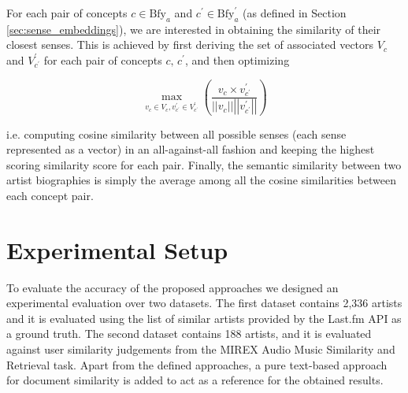 For each pair of concepts $c \in \text{Bfy}_{a}$ and $c^{\prime} \in \text{Bfy}^{\prime}_{a}$ (as defined in Section \ref{sec:sense_embeddings}), we are interested in obtaining the similarity of their closest senses. This is achieved by first deriving the set of associated vectors $V_c$ and $V_{c^{\prime}}^{\prime}$ for each pair of concepts $c,\,c^{\prime}$, and then optimizing

\begin{equation}
\operatorname{max}_{v_c \in V_c , v_{c^{\prime}}^{\prime} \in V_{c^{\prime}}^{\prime}}
\left( \frac{v_c \times v_{c^{\prime}}^{\prime}}{\left\vert\left\vert{v_c}\right\vert\right\vert \left\vert\left\vert{v_{c^{\prime}}^{\prime}}\right\vert\right\vert } \right)
\end{equation}

i.e. computing cosine similarity between all possible senses (each sense represented as a vector) in an all-against-all fashion and keeping the highest scoring similarity score for each pair. Finally, the semantic similarity between two artist biographies is simply the average among all the cosine similarities between each concept pair.

\section{Experimental Setup}
\label{sec:experimentalsetup}

To evaluate the accuracy of the proposed approaches we designed an experimental evaluation over two datasets. The first dataset contains 2,336 artists and it is evaluated using the list of similar artists provided by the Last.fm API as a ground truth. The second dataset contains 188 artists, and it is evaluated against user similarity judgements from the MIREX Audio Music Similarity and Retrieval task.
Apart from the defined approaches, a pure text-based approach for document similarity is added to act as a reference for the obtained results.

